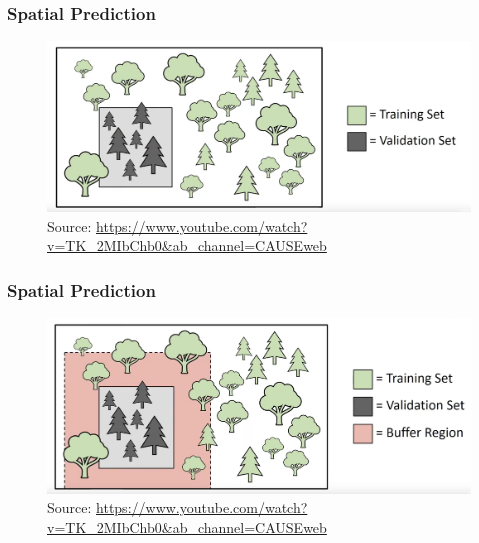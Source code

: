 \documentclass[
  shownotes,
  xcolor={svgnames},
  hyperref={colorlinks,citecolor=DarkBlue,linkcolor=andesred,urlcolor=DarkBlue}
  , aspectratio=169]{beamer}
\begin{document}
\begin{frame}[fragile]
\frametitle{Spatial Prediction}

\begin{figure}[H] \centering
            \captionsetup{justification=centering}
\includegraphics[scale=0.3]{figures/spatial_cross/fig10.png}
\\
\tiny
Source: \url{https://www.youtube.com/watch?v=TK_2MIbChb0&ab_channel=CAUSEweb}
 \end{figure}
\end{frame}

\begin{frame}[fragile]
\frametitle{Spatial Prediction}

\begin{figure}[H] \centering
            \captionsetup{justification=centering}
\includegraphics[scale=0.3]{figures/spatial_cross/fig11.png}
\\
\tiny
Source: \url{https://www.youtube.com/watch?v=TK_2MIbChb0&ab_channel=CAUSEweb}
 \end{figure}
\end{frame}
\end{document}
